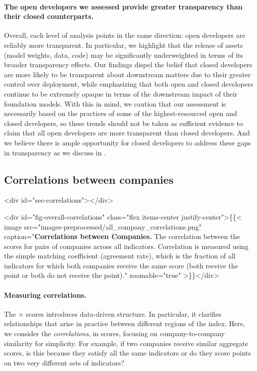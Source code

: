 \documentclass[screen, authorversion, acmsmall]{acmart}
\begin{document}
\paragraph{The open developers we assessed provide greater transparency than their closed counterparts.}
Overall, each level of analysis points in the same direction: open developers are reliably more transparent.
In particular, we highlight that the release of assets (\eg model weights, data, code) may be significantly underweighted in terms of its broader transparency effects.
Our findings dispel the belief that closed developers are more likely to be transparent about downstream matters due to their greater control over deployment, while emphasizing that both open and closed developers continue to be extremely opaque in terms of the downstream impact of their foundation models.
With this in mind, we caution that our assessment is necessarily based on the practices of some of the highest-resourced open and closed developers, so these trends should not be taken as sufficient evidence to claim that all open developers are more transparent than closed developers.
And we believe there is ample opportunity for closed developers to address these gaps in transparency as we discuss in .

\hypertarget{correlations}{\subsection{Correlations between companies}}
<div id="sec-correlations"></div>

<div id="fig-overall-correlations" class="flex items-center justify-center">\{\{< image src="images-preprocessed/all_company_correlations.png" caption="\textbf{Correlations between Companies.} The correlation between the scores for pairs of companies across all indicators. Correlation is measured using the simple matching coefficient (\ie agreement rate), which is the fraction of all indicators for which both companies receive the same score (\ie both receive the point or both do not receive the point)." zoomable="true" >\}\}</div>


\paragraph{Measuring correlations.}
The \numindicators $\times$ \numcompanies scores introduces data-driven structure.
In particular, it clarifies relationships that arise in practice between different regions of the index.
Here, we consider the \textit{correlations}, in scores, focusing on company-to-company similarity for simplicity.
For example, if two companies receive similar aggregate scores, is this because they satisfy all the same indicators or do they score points on two very different sets of indicators?
\end{document}
